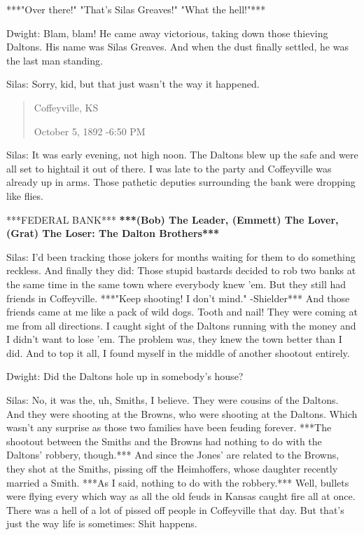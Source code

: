 \documentclass{article}
\begin{document}
***"Over there!" "That's Silas Greaves!" "What the hell!"***

Dwight: Blam, blam! He came away victorious, taking down those thieving Daltons. His name was Silas Greaves. And when the dust finally settled, he was the last man standing.

Silas: Sorry, kid, but that just wasn't the way it happened.

\begin{quote}
    Coffeyville, KS
    
    October 5, 1892 -6:50 PM
\end{quote}

Silas: It was early evening, not high noon. The Daltons blew up the safe and were all set to hightail it out of there. I was late to the party and Coffeyville was already up in arms. Those pathetic deputies surrounding the bank were dropping like flies.

***FEDERAL BANK*** \textbf{***(Bob) The Leader, (Emmett) The Lover, (Grat) The Loser: The Dalton Brothers***}

Silas: I'd been tracking those jokers for months waiting for them to do something reckless. And finally they did: Those stupid bastards decided to rob two banks at the same time in the same town where everybody knew 'em. But they still had friends in Coffeyville. ***"Keep shooting! I don't mind." -Shielder*** And those friends came at me like a pack of wild dogs. Tooth and nail! They were coming at me from all directions. I caught sight of the Daltons running with the money and I didn't want to lose 'em. The problem was, they knew the town better than I did. And to top it all, I found myself in the middle of another shootout entirely.

Dwight: Did the Daltons hole up in somebody's house?

Silas: No, it was the, uh, Smiths, I believe. They were cousins of the Daltons. And they were shooting at the Browns, who were shooting at the Daltons. Which wasn't any surprise as those two families have been feuding forever. ***The shootout between the Smiths and the Browns had nothing to do with the Daltons' robbery, though.*** And since the Jones' are related to the Browns, they shot at the Smiths, pissing off the Heimhoffers, whose daughter recently married a Smith. ***As I said, nothing to do with the robbery.*** Well, bullets were flying every which way as all the old feuds in Kansas caught fire all at once. There was a hell of a lot of pissed off people in Coffeyville that day. But that's just the way life is sometimes: Shit happens.
\end{document}
